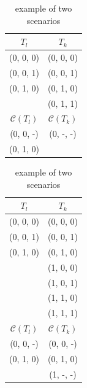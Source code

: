 \documentclass{sig-alternate}
\begin{document}
\begin{table}
\centering
\caption{example of two scenarios}
\label{example_three_condition}
  \begin{tabular}{cc}
$T_{l}$&$T_{k}$ \\ \hline
(0, 0, 0)&(0, 0, 0)\\
(0, 0, 1)&(0, 0, 1) \\
(0, 1, 0)&(0, 1, 0)\\
         &(0, 1, 1) \\ \hline
 $\mathcal{C}(T_{l})$& $\mathcal{C}(T_{k})$ \\ \hline
(0, 0, -)&(0, -, -)\\
(0, 1, 0)&		   \\ \hline
  \end{tabular}
  \hspace{1em}
  \begin{tabular}{cc}
$T_{l}$&$T_{k}$\\ \hline
(0, 0, 0) & (0, 0, 0)\\
(0, 0, 1) & (0, 0, 1)\\
(0, 1, 0) & (0, 1, 0)\\
		  & (1, 0, 0)\\
		  & (1, 0, 1)\\
		  & (1, 1, 0)\\
		  & (1, 1, 1)\\ \hline
$\mathcal{C}(T_{l})$& $\mathcal{C}(T_{k})$ \\ \hline
(0, 0, -)&  (0, 0, -)\\
(0, 1, 0)&  (0, 1, 0)\\
		 &  (1, -, -)\\  \hline
  \end{tabular}
  \end{table}


\end{document}
